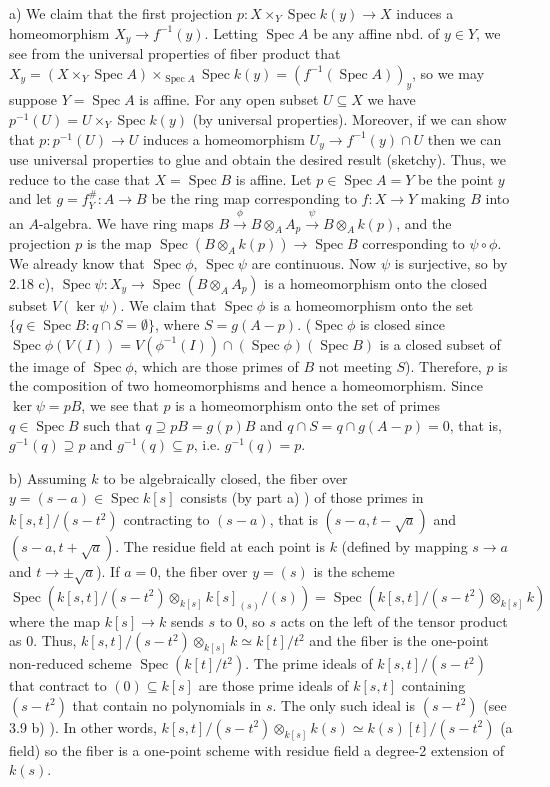 \documentclass{report}
\DeclareMathOperator{\Spec}{Spec}
\begin{document}
\bigskip
{}	a)	We claim that the first projection $p:X\times_Y\Spec k(y)\rightarrow X$ induces a homeomorphism $X_y\rightarrow f^{-1}(y)$.
Letting $\Spec A$ be any affine nbd. of $y\in Y$, we see from the universal properties of fiber product that
$X_y=(X\times_{Y} \Spec A )\times_{\Spec A} \Spec k(y)=(f^{-1}(\Spec A))_y$, so we may suppose $Y=\Spec A$ is affine.
For any open subset $U\subseteq X$ we have $p^{-1}(U)=U\times_Y \Spec k(y)$ (by universal properties).
Moreover, if we can show that $p:p^{-1}(U)\rightarrow U$ induces a homeomorphism $U_y\rightarrow f^{-1}(y)\cap U$
then we can use universal properties to glue and obtain the desired result (sketchy).
Thus, we reduce to the case that $X=\Spec B$ is affine.		
Let $p\in\Spec A=Y$ be the point $y$ and let $g=f^{\#}_Y:A\rightarrow B$ be the ring map corresponding
to $f:X\rightarrow Y$ making $B$ into an $A$-algebra.
We have ring maps $B\xrightarrow{\phi} B\otimes_A A_p\xrightarrow{\psi} B\otimes_A k(p)$, and the projection $p$
is the map $\Spec (B\otimes_A k(p))\rightarrow  \Spec B$ corresponding to $\psi\circ\phi$.
We already know that $\Spec \phi$, $\Spec \psi$ are continuous.
Now $\psi$ is surjective, so by 2.18 c), $\Spec \psi: X_y\rightarrow \Spec (B\otimes_A A_p)$ is a homeomorphism
onto the closed subset $V(\ker\psi)$.  We claim that $\Spec \phi$ is a homeomorphism
onto the set $\{q\in\Spec B:	q\cap S=\emptyset\}$, where $S=g(A-p)$.	
($\Spec\phi$ is closed since $\Spec\phi(V(I))=V(\phi^{-1}(I))\cap  (\Spec\phi)(\Spec B)$ is a closed subset of the image of $\Spec\phi$,
which are those primes of $B$ not meeting $S$).	Therefore, $p$ is the composition of two homeomorphisms and hence a homeomorphism.
Since $\ker\psi=pB$, we see that $p$ is a homeomorphism onto the set of primes $q\in \Spec B$ 
such that $q\supseteq pB=g(p)B$ and $q\cap S=q\cap g(A-p)=0$, that is, $g^{-1}(q)\supseteq p$ and $g^{-1}(q)\subseteq p$,
i.e. $g^{-1}(q)=p$.  


b)	Assuming $k$ to be algebraically closed, the fiber over $y=(s-a)\in\Spec k[s]$ consists (by part a) ) of those
primes in $k[s,t]/(s-t^2)$ contracting to $(s-a)$, that is $(s-a,t-\sqrt{a})$ and $(s-a,t+\sqrt{a})$.  
The residue field at each point is $k$ (defined by mapping $s\rightarrow a$ and $t\rightarrow \pm \sqrt{a}$).
If $a=0$, the fiber over $y=(s)$ is the scheme $\Spec( k[s,t]/(s-t^2)\otimes_{k[s]} k[s]_{(s)}/(s))=\Spec( k[s,t]/(s-t^2) \otimes_{k[s]} k)$
where the map $k[s]\rightarrow k$ sends $s$ to 0, so $s$ acts on the left of the tensor product as 0.
Thus, $k[s,t]/(s-t^2)\otimes_{k[s]} k\simeq k[t]/t^2$ and the fiber is the one-point non-reduced scheme $\Spec (k[t]/t^2)$.
The prime ideals of $k[s,t]/(s-t^2)$ that contract to $(0)\subseteq k[s]$ are those prime ideals of $k[s,t]$ containing $(s-t^2)$
that contain no polynomials in $s$.  The only such ideal is $(s-t^2)$ (see 3.9 b) ).	In other words, 
$k[s,t]/(s-t^2)\otimes_{k[s]} k(s)\simeq k(s)[t]/(s-t^2)$ (a field) so the fiber is a one-point scheme with residue field
a degree-2 extension of $k(s)$.  
\end{document}
